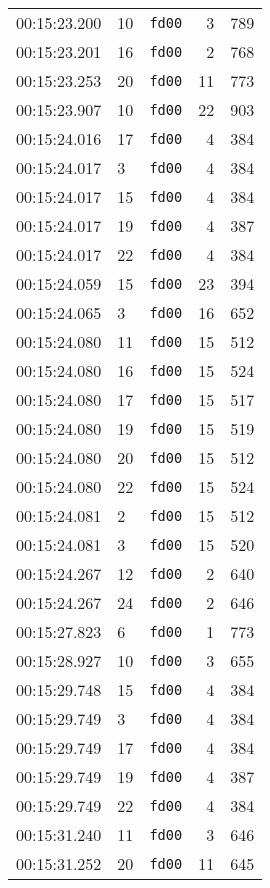 \documentclass{article}
\begin{document}
\begin{longtable}{lllrr}
00:15:23.200 & 10 & \texttt{fd00} & 3 & 789 \\
00:15:23.201 & 16 & \texttt{fd00} & 2 & 768 \\
00:15:23.253 & 20 & \texttt{fd00} & 11 & 773 \\
00:15:23.907 & 10 & \texttt{fd00} & 22 & 903 \\
00:15:24.016 & 17 & \texttt{fd00} & 4 & 384 \\
00:15:24.017 & 3 & \texttt{fd00} & 4 & 384 \\
00:15:24.017 & 15 & \texttt{fd00} & 4 & 384 \\
00:15:24.017 & 19 & \texttt{fd00} & 4 & 387 \\
00:15:24.017 & 22 & \texttt{fd00} & 4 & 384 \\
00:15:24.059 & 15 & \texttt{fd00} & 23 & 394 \\
00:15:24.065 & 3 & \texttt{fd00} & 16 & 652 \\
00:15:24.080 & 11 & \texttt{fd00} & 15 & 512 \\
00:15:24.080 & 16 & \texttt{fd00} & 15 & 524 \\
00:15:24.080 & 17 & \texttt{fd00} & 15 & 517 \\
00:15:24.080 & 19 & \texttt{fd00} & 15 & 519 \\
00:15:24.080 & 20 & \texttt{fd00} & 15 & 512 \\
00:15:24.080 & 22 & \texttt{fd00} & 15 & 524 \\
00:15:24.081 & 2 & \texttt{fd00} & 15 & 512 \\
00:15:24.081 & 3 & \texttt{fd00} & 15 & 520 \\
00:15:24.267 & 12 & \texttt{fd00} & 2 & 640 \\
00:15:24.267 & 24 & \texttt{fd00} & 2 & 646 \\
00:15:27.823 & 6 & \texttt{fd00} & 1 & 773 \\
00:15:28.927 & 10 & \texttt{fd00} & 3 & 655 \\
00:15:29.748 & 15 & \texttt{fd00} & 4 & 384 \\
00:15:29.749 & 3 & \texttt{fd00} & 4 & 384 \\
00:15:29.749 & 17 & \texttt{fd00} & 4 & 384 \\
00:15:29.749 & 19 & \texttt{fd00} & 4 & 387 \\
00:15:29.749 & 22 & \texttt{fd00} & 4 & 384 \\
00:15:31.240 & 11 & \texttt{fd00} & 3 & 646 \\
00:15:31.252 & 20 & \texttt{fd00} & 11 & 645 \\

\end{longtable}
\end{document}
